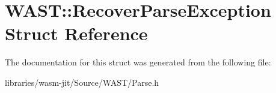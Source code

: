 \hypertarget{struct_w_a_s_t_1_1_recover_parse_exception}{}\section{W\+A\+ST\+:\+:Recover\+Parse\+Exception Struct Reference}
\label{struct_w_a_s_t_1_1_recover_parse_exception}


The documentation for this struct was generated from the following file\+:\begin{DoxyCompactItemize}
\item 
libraries/wasm-\/jit/\+Source/\+W\+A\+S\+T/Parse.\+h\end{DoxyCompactItemize}
